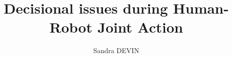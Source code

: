 %
%
%
% 
%



\title{\textbf{\large Decisional issues during Human-Robot Joint Action}}
\author{Sandra DEVIN}

